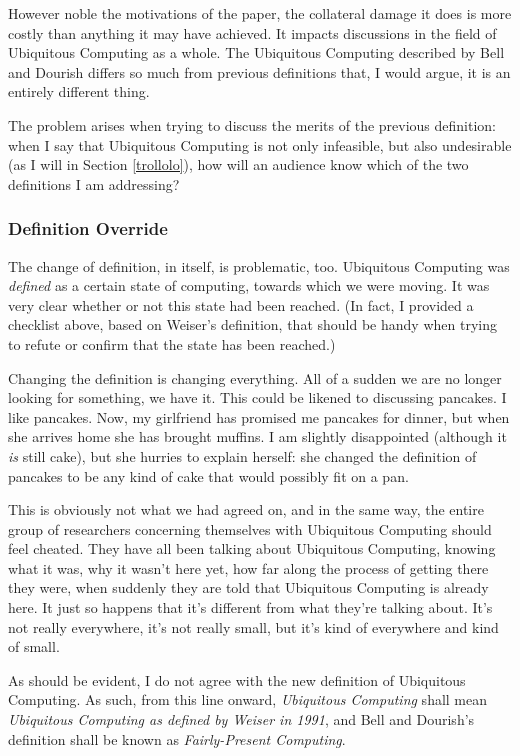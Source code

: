 However noble the motivations of the paper, the collateral damage it does is more costly than anything it may have
achieved. It impacts discussions in the field of Ubiquitous Computing as a whole. The Ubiquitous Computing described
by Bell and Dourish differs so much from previous definitions that, I would argue, it is an entirely different
thing.

The problem arises when trying to discuss the merits of the previous definition: when I say that Ubiquitous
Computing is not only infeasible, but also undesirable (as I will in Section \ref{trollolo}), how will an audience
know which of the two definitions I am addressing?

\subsubsection{Definition Override}

The change of definition, in itself, is problematic, too. Ubiquitous Computing was \emph{defined} as a certain state
of computing, towards which we were moving. It was very clear whether or not this state had been reached. (In fact,
I provided a checklist above, based on Weiser's definition, that should be handy when trying to refute or confirm that
the state has been reached.)

Changing the definition is changing everything. All of a sudden we are no longer looking
for something, we have it. This could be likened to discussing pancakes. I like pancakes. Now, my girlfriend has
promised me pancakes for dinner, but when she arrives home she has brought muffins. I am slightly disappointed (although
it \emph{is} still cake), but she hurries to explain herself: she changed the definition of pancakes to be any kind
of cake that would possibly fit on a pan.

This is obviously not what we had agreed on, and in the same way, the entire
group of researchers concerning themselves with Ubiquitous Computing should feel cheated. They have all been talking
about Ubiquitous Computing, knowing what it was, why it wasn't here yet, how far along the process of getting there
they were, when suddenly they are told that Ubiquitous Computing is already here. It just so happens that it's different
from what they're talking about. It's not really everywhere, it's not really small, but it's kind of everywhere and kind
of small.

As should be evident, I do not agree with the new definition of Ubiquitous Computing. As such, from this line onward,
\emph{Ubiquitous Computing} shall mean \emph{Ubiquitous Computing as defined by Weiser in 1991}, and Bell and Dourish's
definition shall be known as \emph{Fairly-Present Computing}.